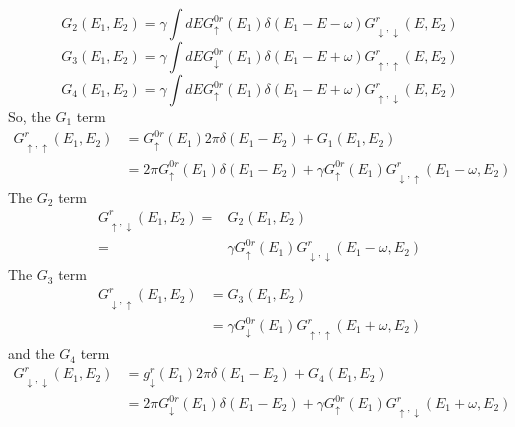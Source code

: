\documentclass[11pt,a4paper]{article}
\begin{document}
\begin{equation}
G_{2}(E_{1},E_{2}) = \gamma\int dE G_{ \uparrow}^{0r} \left(E_{1}\right)  \delta(E_{1}-E-\omega) G_{ \downarrow, \downarrow}^{r}(E,E_{2})
\end{equation}
\begin{equation}
G_{3}(E_{1},E_{2}) =  \gamma \int dE G_{ \downarrow}^{0r}\left(E_{1}\right)  \delta(E_{1}-E+\omega) G_{ \uparrow, \uparrow}^{r}(E,E_{2})
\end{equation}
\begin{equation}
G_{4}(E_{1},E_{2}) = \gamma\int dE G_{ \uparrow}^{0r}\left(E_{1}\right)  \delta(E_{1}-E+\omega) G_{ \uparrow, \downarrow}^{r}(E,E_{2})
\end{equation}
So, the $G_{1}$ term
\begin{equation}
\begin{split}
G_{ \uparrow, \uparrow}^{r}(E_{1}, E_{2}) &= G_{ \uparrow}^{0r}\left(E_{1}\right) 2 \pi \delta\left(E_{1}-E_{2}\right) + G_{1}\left(E_{1}, E_{2}\right) \\
&= 2 \pi G_{ \uparrow}^{0r}\left(E_{1}\right) \delta\left(E_{1}-E_{2}\right) + \gamma G_{ \uparrow}^{0r}\left(E_{1}\right)  G_{ \downarrow, \uparrow}^{r}\left(E_{1}-\omega, E_{2}\right)
\end{split}
\end{equation}
The $G_{2}$ term
\begin{equation}
\begin{split}
G_{ \uparrow, \downarrow}^{r}\left(E_{1}, E_{2}\right) =& G_{2}\left(E_{1}, E_{2}\right) \\
=& \gamma G_{ \uparrow}^{0r} \left(E_{1}\right) G_{ \downarrow, \downarrow}^{r}(E_{1}-\omega,E_{2})
\end{split}
\end{equation}
The $G_{3}$ term
\begin{equation}
\begin{split}
G_{ \downarrow, \uparrow}^{r}\left(E_{1}, E_{2}\right) &= G_{3}\left(E_{1}, E_{2}\right) \\
&= \gamma G_{ \downarrow}^{0r} \left(E_{1}\right) G_{ \uparrow, \uparrow}^{r}(E_{1}+\omega,E_{2})
\end{split}
\end{equation}
and the $G_{4}$ term
\begin{equation}
\begin{split}
G_{ \downarrow, \downarrow}^{r}\left(E_{1}, E_{2}\right) &= g_{ \downarrow}^{r}\left(E_{1}\right) 2 \pi \delta\left(E_{1}-E_{2}\right) +G_{4}\left(E_{1}, E_{2}\right)\\
&= 2 \pi G_{ \downarrow}^{0r}\left(E_{1}\right) \delta\left(E_{1}-E_{2}\right) + \gamma G_{ \uparrow}^{0r}(E_{1}) G_{ \uparrow, \downarrow}^{r}(E_{1}+\omega, E_{2})
\end{split}
\end{equation}
\end{document}
